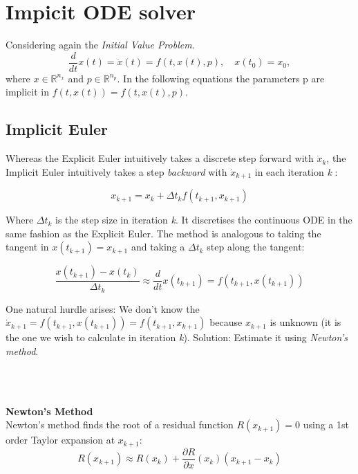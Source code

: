 \section{Impicit ODE solver}
Considering again the \textit{Initial Value Problem}.
$$
\frac{d}{d t} x(t)= \dot{x}(t)=f(t, x(t), p), \quad x\left(t_{0}\right)=x_{0},
$$
where $x \in \mathbb{R}^{n_{x}}$ and $p \in \mathbb{R}^{n_{p}}$. In the following equations the parameters p are implicit in $f(t, x(t)) = f(t, x(t), p)$.

\subsection{Implicit Euler}
Whereas the Explicit Euler intuitively takes a discrete step forward with $\dot{x}_k$, the Implicit Euler intuitively takes a step \textit{backward} with $\dot{x}_{k+1}$ in each iteration \textit{k} \cite{JrgensenScientificEquationsb}:

\begin{equation}
    x_{k+1}=x_{k}+\Delta t_k f\left(t_{k+1}, x_{k+1}\right)
\end{equation}

Where $\Delta t_k$ is the step size in iteration \textit{k}. It discretises the continuous ODE in the same fashion as the Explicit Euler. The method is analogous to taking the tangent in $x(t_{k+1}) = x_{k+1}$ and taking a $\Delta t_k$ step along the tangent:

\begin{equation}
\frac{x\left(t_{k+1}\right)-x\left(t_{k}\right)}{\Delta t_{k}} \approx \frac{d}{d t} x\left(t_{k+1}\right)=f\left(t_{k+1}, x\left(t_{k+1}\right)\right)
\end{equation}

One natural hurdle arises: We don't know the $\dot{x}_{k+1} = f\left(t_{k+1}, x\left(t_{k+1}\right)\right) = f\left(t_{k+1}, x_{k+1}\right)$ because $x_{k+1}$ is unknown (it is the one we wish to calculate in iteration \textit{k}). Solution: Estimate it using \textit{Newton's method}.

\\\

\textbf{Newton's Method} \\
Newton's method finds the root of a residual function $R(x_{k+1})=0$ using a 1st order Taylor expansion at $x_{k+1}$:
\begin{equation}
    R(x_{k+1}) \approx R(x_k) + \frac{\partial R}{\partial x}\left(x_{k
    }\right)\left(x_{k+1} - x_{k}\right)
\end{equation}

